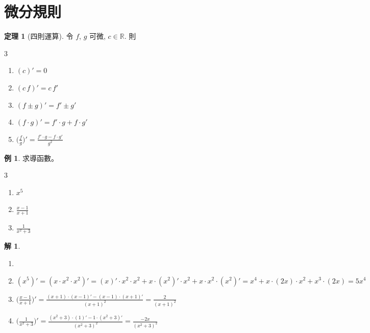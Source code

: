 \documentclass[12pt]{extarticle}
\newcommand{\ds}{\displaystyle}
\theoremstyle{definition}
\newtheorem*{thm}{定理}
\newtheorem*{ex}{例}
\newtheorem*{sol}{解}
\begin{document}
\section*{微分規則}

\begin{thm}[四則運算] 令 $f$, $g$ 可微, $c\in\mathbb{R}$. 則
  \setlength{\columnsep}{-0mm}
  \begin{multicols}{3}
    \begin{enumerate}\setlength\itemsep{0em}
      \item $\ds (c)' = 0$
      \item $\ds (c\,f)' = c\,f'$
      \item $\ds (f\pm g)' = f'\pm g'$
      \item $\ds (f\cdot g)' = f'\cdot g + f\cdot g'$
      \item $\ds \Big(\frac{f}{g}\Big)' = \frac{f'\cdot g - f\cdot g'}{g^2}$
    \end{enumerate}
  \end{multicols}
\end{thm}

\begin{ex} 求導函數。
  \begin{multicols}{3}
    \begin{enumerate}\setlength\itemsep{0em}
      \item $x^5$
      \item $\frac{x - 1}{x + 1}$
      \item $\frac{1}{x^2 + 3}$
    \end{enumerate}
  \end{multicols}
\end{ex}

\begin{sol}
  \begin{enumerate}\setlength\itemsep{0em}
    \item[]
    \item $\ds (x^5)' = (x \cdot x^2 \cdot x^2)' = (x)'\cdot x^2 \cdot x^2 + x\cdot(x^2)'\cdot x^2 + x\cdot x^2\cdot(x^2)' = x^4 + x\cdot(2x)\cdot x^2 + x^3\cdot(2x) = 5 x^4$
    \item $\ds\Big(\frac{x - 1}{x + 1}\Big)' = \frac{(x + 1)\cdot(x - 1)' - (x - 1)\cdot(x + 1)'}{(x + 1)^2} = \frac{2}{(x + 1)^2}$ 
    \item $\ds\Big(\frac{1}{x^2 + 3}\Big)' = \frac{(x^2 + 3)\cdot(1)' - 1\cdot(x^2 + 3)'}{(x^2 + 3)^2} = \frac{-2x}{(x^2 + 3)^2}$
  \end{enumerate}
\end{sol}
\end{document}

